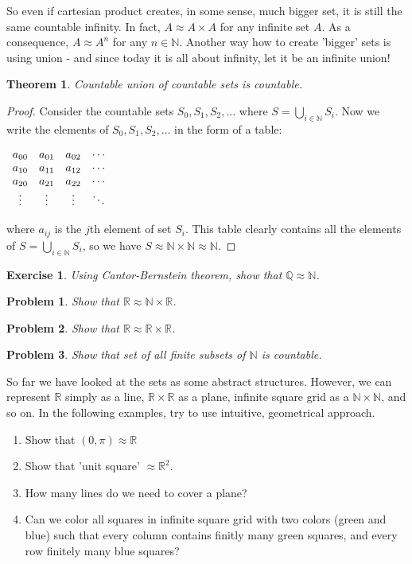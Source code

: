 \documentclass[11pt,a5paper]{article}
\newtheorem{theorem}{Theorem}
\newtheorem{exercise}{Exercise}
\newtheorem{problem}{Problem}
\begin{document}
\noindent So even if cartesian product creates, in some sense, much bigger set, it is still the same countable infinity. In fact, $A\approx A\times A$ for any infinite set $A$. As a consequence, $A\approx A^n$ for any $n\in \mathbb{N}$. Another way how to create 'bigger' sets is using union - and since today it is all about infinity, let it be an infinite union!
\begin{theorem}
Countable union of countable sets is countable.
\end{theorem}
\begin{proof} Consider the countable sets $S_0, S_1, S_2, \ldots$ where $\displaystyle S = \bigcup_{i \mathop \in \mathbb{N}} {S_i}$. Now we write the elements of $S_0, S_1, S_2, \ldots$ in the form of a table:

$\begin{array} {*{4}c} {a_{00}} & {a_{01}} & {a_{02}} & \cdots \\ {a_{10}} & {a_{11}} & {a_{12}} & \cdots \\ {a_{20}} & {a_{21}} & {a_{22}} & \cdots \\ \vdots & \vdots & \vdots & \ddots \\ \end{array}$

\noindent where $a_{ij}$ is the $j$th element of set $S_i$. This table clearly contains all the elements of $\displaystyle S = \bigcup_{i \mathop \in \mathbb{N}} {S_i}$, so we have $S \approx \mathbb{N}\times\mathbb{N} \approx \mathbb{N}$.
\end{proof}

\begin{exercise} Using Cantor-Bernstein theorem, show that $\mathbb{Q}\approx\mathbb{N}$. 
\end{exercise}
\begin{problem} Show that $\mathbb{R} \approx \mathbb{N} \times \mathbb{R}$.
\end{problem}
\begin{problem} Show that $\mathbb{R} \approx \mathbb{R} \times \mathbb{R}$.
\end{problem}
\begin{problem} Show that set of all finite subsets of $\mathbb{N}$ is countable.
\end{problem}

\noindent So far we have looked at the sets as some abstract structures. However, we can represent $\mathbb{R}$ simply as a line, $\mathbb{R}\times\mathbb{R}$ as a plane, infinite square grid as a $\mathbb{N}\times\mathbb{N}$, and so on. In the following examples, try to use intuitive, geometrical approach.
\begin{enumerate}
  \item Show that $(0,\pi)\approx\mathbb{R}$
  \item Show that 'unit square' $\approx\mathbb{R}^2$.
  \item How many lines do we need to cover a plane?
  \item Can we color all squares in infinite square grid with two colors (green and blue) such that every column contains finitly many green squares, and every row finitely many blue squares?
\end{enumerate}
\end{document}
